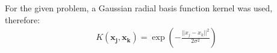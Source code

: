 For the given problem, a Gaussian radial basis function kernel was used, therefore:
\begin{align}
K(\mathbf{x_j}, \mathbf{x_k}) = \exp(-\frac{||x_j - x_k ||^2}{2\sigma^2})
\end{align}
